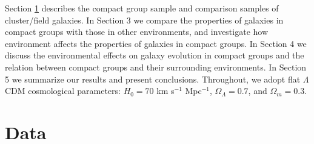 \documentclass[12pt,preprint,apj]{emulateapj}
\begin{document}
Section \ref{data} describes the compact group sample and 
comparison samples of cluster/field galaxies. 
In Section 3 we compare the properties of galaxies in compact groups with 
those in other environments, and investigate how environment affects 
the properties of galaxies in compact groups. 
In Section 4 we discuss the environmental effects on galaxy evolution 
in compact groups
and the relation between compact groups and their surrounding environments.
In Section 5 we summarize our results and present conclusions.
Throughout, we adopt flat $\Lambda$CDM cosmological parameters: 
$H_0=70$ km s$^{-1}$ Mpc$^{-1}$, $\Omega_{\Lambda}=0.7$, and 
$\Omega_{m}=0.3$.



\section{Data}\label{data}

\end{document}
